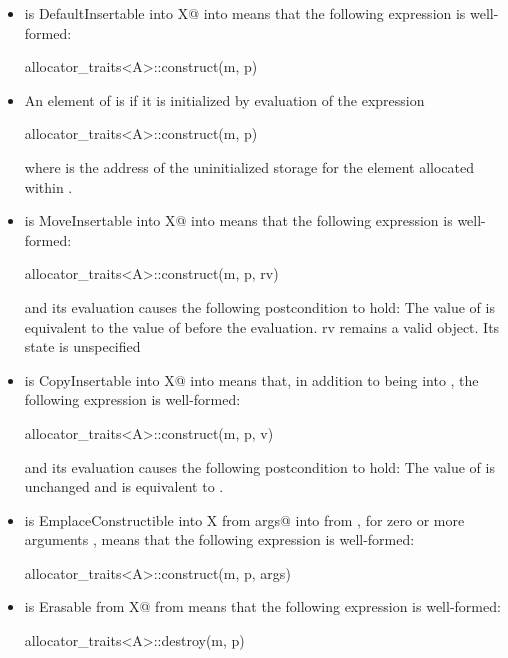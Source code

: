\begin{itemize}
\item
{} is 
{DefaultInsertable into X@ into }
means that the following expression is well-formed:
\begin{codeblock}
allocator_traits<A>::construct(m, p)
\end{codeblock}

\item
An element of  is  if it is initialized
by evaluation of the expression
\begin{codeblock}
allocator_traits<A>::construct(m, p)
\end{codeblock}
where  is the address of the uninitialized storage for the element
allocated within .
	
\item
{} is 
{MoveInsertable into X@ into }
means that the following expression
is well-formed:
\begin{codeblock}
allocator_traits<A>::construct(m, p, rv)
\end{codeblock}
and its evaluation causes the following postcondition to hold: The value
of  is equivalent to the value of  before the evaluation.
\enternote rv remains a valid object. Its state is unspecified \exitnote

\item
{} is 
{CopyInsertable into X@ into }
means that, in addition to  being  into
, the following expression is well-formed:
\begin{codeblock}
allocator_traits<A>::construct(m, p, v)
\end{codeblock}
and its evaluation causes the following postcondition to hold:
The value of  is unchanged and is equivalent to .

\item
{} is
{EmplaceConstructible into X from args@ into  from },
for zero
or more arguments , means that the following expression is well-formed:
\begin{codeblock}
allocator_traits<A>::construct(m, p, args)
\end{codeblock}

\item
{} is
{Erasable from X@ from }
means that the following expression is well-formed:
\begin{codeblock}
allocator_traits<A>::destroy(m, p)
\end{codeblock}
\end{itemize}

